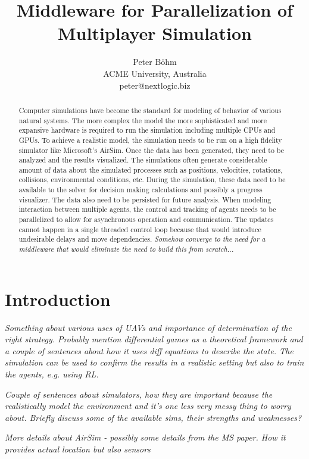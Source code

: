 \documentclass{article}
\title{Middleware for Parallelization of Multiplayer Simulation}
\author{Peter Böhm \\ ACME University, Australia \\ 
peter@nextlogic.biz}
\begin{document}
\maketitle

\begin{abstract}
Computer simulations have become the standard for modeling of behavior of various natural systems. The more complex the model the more sophisticated and more expansive hardware is required to run the simulation including multiple CPUs and GPUs. To achieve a realistic model, the simulation needs to be run on a high fidelity simulator like Microsoft's AirSim. Once the data has been generated, they need to be analyzed and the results visualized. The simulations often generate considerable amount of data about the simulated processes such as positions, velocities, rotations, collisions, environmental conditions, etc. During the simulation, these data need to be available to the solver for decision making calculations and possibly a progress visualizer. The data also need to be persisted for future analysis. When modeling interaction between multiple agents, the control and tracking of agents needs to be parallelized to allow for asynchronous operation and communication. The updates cannot happen in a single threaded control loop because that would introduce undesirable delays and move dependencies. \emph{Somehow converge to the need for a middleware that would eliminate the need to build this from scratch...} 
\end{abstract}

\section{Introduction}

\emph{Something about various uses of UAVs and importance of determination of the right strategy. Probably mention differential games as a theoretical framework and a couple of sentences about how it uses diff equations to describe the state. The simulation can be used to confirm the results in a realistic setting but also to train the agents, e.g. using RL. }

\emph{Couple of sentences about simulators, how they are important because the realistically model the environment and it's one less very messy thing to worry about. Briefly discuss some of the available sims, their strengths and weaknesses?}

\emph{More details about AirSim - possibly some details from the MS paper. How it provides actual location but also sensors}
\end{document}
